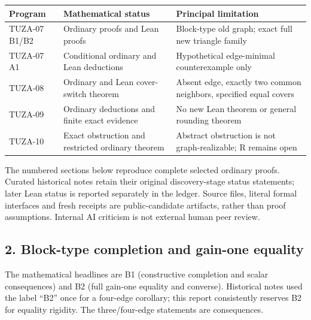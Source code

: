 \documentclass[11pt]{article}
\begin{document}
{\def\LTcaptype{none} %
\begin{longtable}[]{@{}
  >{\raggedright\arraybackslash}p{}
  >{\raggedright\arraybackslash}p{}
  >{\raggedright\arraybackslash}p{}@{}}
\toprule\noalign{}
\begin{minipage}[b]{\linewidth}\raggedright
Program
\end{minipage} & \begin{minipage}[b]{\linewidth}\raggedright
Mathematical status
\end{minipage} & \begin{minipage}[b]{\linewidth}\raggedright
Principal limitation
\end{minipage} \\
\midrule\noalign{}
\endhead
\bottomrule\noalign{}
\endlastfoot
TUZA-07 B1/B2 & Ordinary proofs and Lean proofs & Block-type old graph; exact full new triangle family \\
TUZA-07 A1 & Conditional ordinary and Lean deductions & Hypothetical edge-minimal counterexample only \\
TUZA-08 & Ordinary and Lean cover-switch theorem & Absent edge, exactly two common neighbors, specified equal covers \\
TUZA-09 & Ordinary deductions and finite exact evidence & No new Lean theorem or general rounding theorem \\
TUZA-10 & Exact obstruction and restricted ordinary theorem & Abstract obstruction is not graph-realizable; R remains open \\
\end{longtable}
}

The numbered sections below reproduce complete selected ordinary proofs. Curated historical notes retain their original discovery-stage status statements; later Lean status is reported separately in the ledger. Source files, literal formal interfaces and fresh receipts are public-candidate artifacts, rather than proof assumptions. Internal AI criticism is not external human peer review.

\subsection{2. Block-type completion and gain-one equality}\label{block-type-completion-and-gain-one-equality}

The mathematical headlines are B1 (constructive completion and scalar consequences) and B2 (full gain-one equality and converse). Historical notes used the label ``B2'' once for a four-edge corollary; this report consistently reserves B2 for equality rigidity. The three/four-edge statements are consequences.
\end{document}
